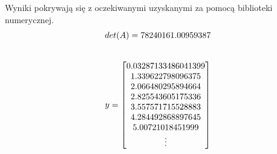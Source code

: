 \documentclass[11pt]{extarticle}
\begin{document}
	Wyniki pokrywają się z oczekiwanymi uzyskanymi za pomocą biblioteki numerycznej.
	\begin{align}
		\setlength{\jot}{10pt}
		det(A) = 78240161.00959387 \\[20pt]
		y = \begin{bmatrix}
			0.03287133486041399 \\
			1.339622798096375 \\
			2.066480295894664 \\
			2.825543605175336 \\
			3.557571715528883 \\
			4.284492868897645 \\
			5.00721018451999 \\
			\vdots \\

\end{bmatrix}
\end{align}
\end{document}

